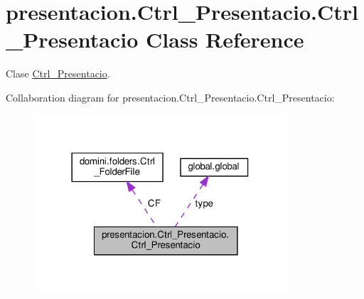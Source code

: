 \hypertarget{classpresentacion_1_1Ctrl__Presentacio_1_1Ctrl__Presentacio}{}\section{presentacion.\+Ctrl\+\_\+\+Presentacio.\+Ctrl\+\_\+\+Presentacio Class Reference}
\label{classpresentacion_1_1Ctrl__Presentacio_1_1Ctrl__Presentacio}


Clase \hyperlink{classpresentacion_1_1Ctrl__Presentacio_1_1Ctrl__Presentacio}{Ctrl\+\_\+\+Presentacio}.  




Collaboration diagram for presentacion.\+Ctrl\+\_\+\+Presentacio.\+Ctrl\+\_\+\+Presentacio\+:
\nopagebreak
\begin{figure}[H]
\begin{center}
\leavevmode
\includegraphics[width=266pt]{classpresentacion_1_1Ctrl__Presentacio_1_1Ctrl__Presentacio__coll__graph}
\end{center}
\end{figure}
